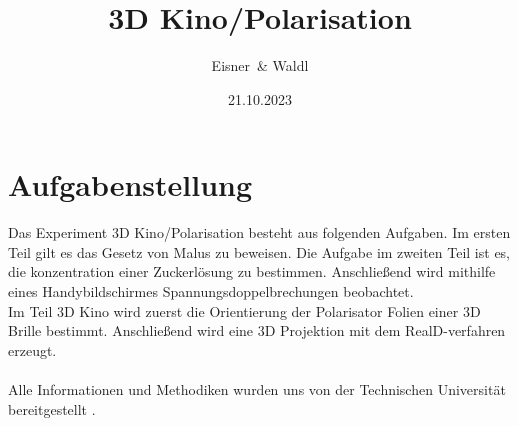 \documentclass[12pt,a4paper,twoside]{article}
\begin{document}
\newcommand\laboratorynumber{2}
\title{3D Kino/Polarisation}
\newcommand\supervisor{Ditlbacher, Harald}
\newcommand\groupnumber{42}

\newcommand\participantonelastname{Eisner}
\newcommand\participantonefirstname{Nico}
\newcommand\participantoneid{12214121}
\newcommand\participanttwolastname{Waldl}
\newcommand\participanttwofirstname{Philip}
\newcommand\participanttwoid{12214120}
\author{\participantonelastname \ \& \participanttwolastname}

\newcommand\degreeid{UB 033 678}
\newcommand\semester{23WS}
\date{21.10.2023}

\newcommand\coursetitle{Laborübungen 2: \\ Elektrizität, Magnetismus, Optik}

%



\tableofcontents
\newpage

\section{Aufgabenstellung} %
Das Experiment 3D Kino/Polarisation besteht aus folgenden Aufgaben. 
Im ersten Teil gilt es das Gesetz von Malus zu beweisen. 
Die Aufgabe im zweiten Teil ist es, die konzentration einer Zuckerlösung zu bestimmen. 
Anschließend wird mithilfe eines Handybildschirmes Spannungsdoppelbrechungen beobachtet. 
\\
Im Teil 3D Kino wird zuerst die Orientierung der Polarisator Folien einer 3D Brille bestimmt. 
Anschließend wird eine 3D Projektion mit dem RealD-verfahren erzeugt. 
\\
\\
Alle Informationen und Methodiken wurden uns von der Technischen Universität bereitgestellt \cite{teachcenter2}. 
\end{document}
